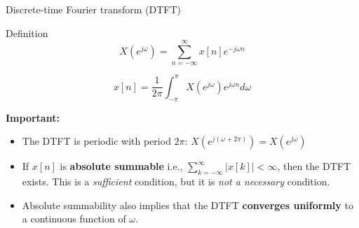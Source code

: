 \documentclass[10pt, handout]{beamer}
\begin{document}
%
\begin{frame}{Discrete-time Fourier transform (DTFT)}

\begin{block}{Definition}
\begin{equation} \tag{Direct transform}
X(e^{j\omega}) = \sum_{n=-\infty}^{\infty} x[n]e^{-j\omega n} 
\end{equation}

\begin{equation}\tag{Inverse transform}
x[n] = \frac{1}{2\pi}\int_{-\pi}^{\pi}X(e^{j\omega})e^{j\omega n}d\omega
\end{equation}
\end{block}

\textbf{Important:}
\begin{itemize}
	\item The DTFT is periodic with period $2\pi$: $\displaystyle X(e^{j(\omega + 2\pi)}) = X(e^{j\omega})$
	\item If $x[n]$ is \textbf{absolute summable} i.e., $\sum_{k=-\infty}^{\infty} |x[k]| < \infty$, then the DTFT exists. This is a \textit{sufficient} condition, but it is \textit{not a necessary} condition.
	\item Absolute summability also implies that the DTFT \textbf{converges uniformly} to a continuous function of $\omega$.
\end{itemize}
\end{frame}
\end{document}
